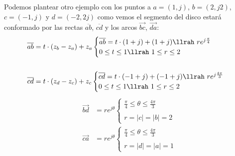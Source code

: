 Podemos plantear otro ejemplo con los puntos a $a=(1,j)$, $b=(2,j2)$, $c=(-1,j)$ y $d=(-2,2j)$ como vemos el segmento del disco estará conformado por las rectas $\overline{ab}$, $\overline{cd}$ y los arcos $\vec{bc}$, $\vec{da}$:
\begin{equation}
    \begin{aligned}
        \overline{ab}&=t\cdot(z_b-z_a)+z_a
        \begin{cases}
        \overline{ab}=t\cdot(1+j)+(1+j) \llrah\ re^{j\frac{\pi}{4}}\\
            0\leq t\leq 1 \llrah\ 1\leq r\leq 2
        \end{cases}\\
        \\
        \overline{cd}&=t\cdot(z_d-z_c)+z_c 
        \begin{cases}
        \overline{cd}=t\cdot(-1+j)+(-1+j) \llrah\ re^{j\frac{4\pi}{3}}\\
            0\leq t\leq 1 \llrah\ 1\leq r\leq 2
        \end{cases}\\
    \end{aligned}
\end{equation}
\begin{equation}
    \begin{aligned}
     \vec{bd}&=re^{j\theta}
    \begin{cases}
       \frac{\pi}{4}\leq\theta\leq\frac{4\pi}{3}\\
        \\
        r=|c|=|b|=2
    \end{cases}\\
     \vec{ca}&=re^{j\theta}
    \begin{cases}
       \frac{\pi}{4}\leq\theta\leq\frac{4\pi}{3}\\
        \\
        r=|d|=|a|=1
    \end{cases}
    \end{aligned}
\end{equation}
\begin{figure}[H]
    \centering
    
    \label{fig:SegDiscCF2}
\end{figure}

